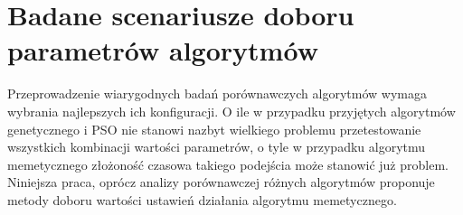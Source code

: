 \section{Badane scenariusze doboru parametrów algorytmów}
\label{sec:badane_scenariusze_doboru_parametrow}
\par
Przeprowadzenie wiarygodnych badań porównawczych algorytmów wymaga wybrania najlepszych ich konfiguracji. O ile w przypadku przyjętych algorytmów genetycznego i PSO nie stanowi nazbyt wielkiego problemu przetestowanie wszystkich kombinacji wartości parametrów, o tyle w przypadku algorytmu memetycznego złożoność czasowa takiego podejścia może stanowić już problem. Niniejsza praca, oprócz analizy porównawczej różnych algorytmów proponuje metody doboru wartości ustawień działania algorytmu memetycznego. 
